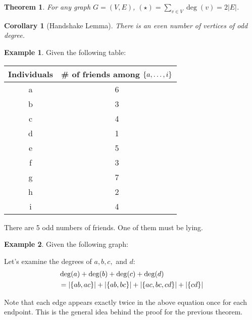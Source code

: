 \documentclass[]{article}
\newtheorem*{theorem}{Theorem}
\newtheorem*{corollary}{Corollary}
\theoremstyle{definition}
\newtheorem{ex}{Example}[section]
\newcommand{\lecture}[1]{\marginpar{{\footnotesize $\leftarrow$ \underline{#1}}}}
\DeclarePairedDelimiter{\set}{\lbrace}{\rbrace}
\begin{document}
			\begin{theorem}
				For any graph $G = (V, E)$, $(\star) = \displaystyle \sum_{v \in V} \deg(v) = 2|E|$.
			\end{theorem}

			\begin{corollary}[Handshake Lemma]
				There is an even number of vertices of odd degree.
			\end{corollary}
			
			\begin{ex} Given the following table:
				\begin{center}
					\begin{tabular}{c|c}
						Individuals & \# of friends among $\set{a, \ldots, i}$ \\ \hline
						a & 6 \\
						b & 3 \\
						c & 4 \\
						d & 1 \\
						e & 5 \\
						f & 3 \\
						g & 7 \\
						h & 2 \\
						i & 4
					\end{tabular}
				\end{center}
				
				There are 5 odd numbers of friends. One of them must be lying.
			\end{ex}
			
			\lecture{February 25, 2013}
			\begin{ex}
				Given the following graph:
				\begin{center}
				\end{center}

				Let's examine the degrees of $a, b, c,$ and $d$:
				\begin{align*}
					&\deg(a) + \deg(b) + \deg(c) + \deg(d) \\
					&= |\set{ab, ac}| + |\set{ab, bc}| + |\set{ac, bc, cd}| + |\set{cd}|
				\end{align*}

				Note that each edge appears exactly twice in the above equation \textendash{} once for each endpoint. This is the general idea behind the proof for the previous theorem.
			\end{ex}
\end{document}
